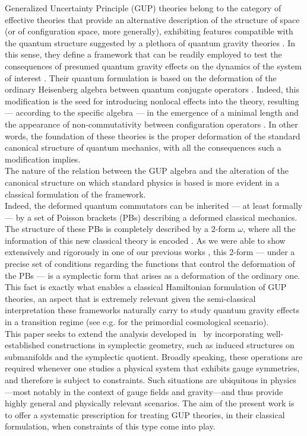 \documentclass{article}
\numberwithin{equation}{section}
\theoremstyle{definition}
\begin{document}
Generalized Uncertainty Principle (GUP) theories belong to the category of effective theories that provide an alternative description of the structure of space (or of configuration space, more generally), exhibiting features compatible with the quantum structure suggested by a plethora of quantum gravity theories \cite{konishi1990minimum, maggiore1993generalized}. In this sense, they define a framework that can be readily employed to test the consequences of presumed quantum gravity effects on the dynamics of the system of interest \cite{ali2009discreteness, das2009phenomenological}. Their quantum formulation is based on the deformation of the ordinary Heisenberg algebra between quantum conjugate operators \cite{Kempf:1993bq, Kempf:1994su}. Indeed, this modification is the seed for introducing nonlocal effects into the theory, resulting — according to the specific algebra — in the emergence of a minimal length and the appearance of non-commutativity between configuration operators \cite{segreto2023extended, Segreto:2024vtu}. In other words, the foundation of these theories is the proper deformation of the standard canonical structure of quantum mechanics, with all the consequences such a modification implies. \\
The nature of the relation between the GUP algebra and the alteration of the canonical structure on which standard physics is based is more evident in a classical formulation of the framework.\\
Indeed, the deformed quantum commutators can be inherited — at least formally — by a set of Poisson brackets (PBs) describing a deformed classical mechanics. The structure of these PBs is completely described by a 2-form $\omega$, where all the information of this new classical theory is encoded \cite{Lee_2014}. As we were able to show extensively and rigorously in one of our previous works \cite{Bruno_Segreto_2024}, this 2-form — under a precise set of conditions regarding the functions that control the deformation of the PBs — is a symplectic form that arises as a deformation of the ordinary one. This fact is exactly what enables a classical Hamiltonian formulation of GUP theories, an aspect that is extremely relevant given the semi-classical interpretation these frameworks naturally carry to study quantum gravity effects in a transition regime (see e.g. \cite{segreto2025dynamics} for the primordial cosmological scenario).\\
This paper seeks to extend the analysis developed in~\cite{Bruno_Segreto_2024} by incorporating well-established constructions in symplectic geometry, such as induced structures on submanifolds and the symplectic quotient. Broadly speaking, these operations are required whenever one studies a physical system that exhibits gauge symmetries, and therefore is subject to constraints. Such situations are ubiquitous in physics—most notably in the context of gauge fields and gravity—and thus provide highly general and physically relevant scenarios. The aim of the present work is to offer a systematic prescription for treating GUP theories, in their classical formulation, when constraints of this type come into play.
\end{document}
